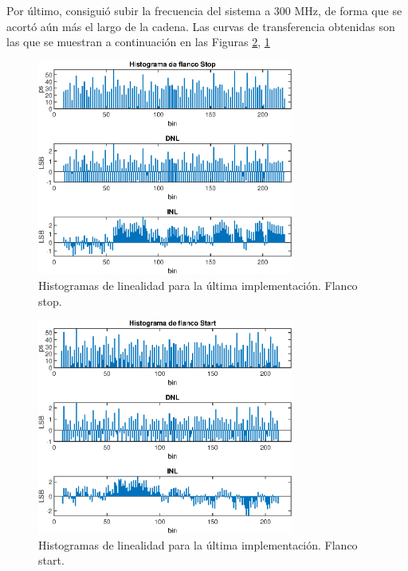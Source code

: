 Por último, consiguió subir la frecuencia del sistema a $300$ MHz, de forma que se acortó 
 aún más el largo de la cadena. Las curvas de transferencia obtenidas son las que se muestran a continuación 
 en las Figuras \ref{fig: transferencia_start_med5}, \ref{fig: transferencia_stop_med5}

 \begin{figure}[H]
      \centering
      \includegraphics[width=0.75\textwidth]{imagenes/linealidad_stop_med5.eps}
      \caption{Histogramas de linealidad para la última implementación. Flanco stop.}
      \label{fig: transferencia_stop_med5}
 \end{figure}
 \begin{figure}[H]
     \centering
     \includegraphics[width=0.75\textwidth]{imagenes/linealidad_start_med5.eps}
     \caption{Histogramas de linealidad para la última implementación. Flanco start.}
     \label{fig: transferencia_start_med5}
\end{figure}

